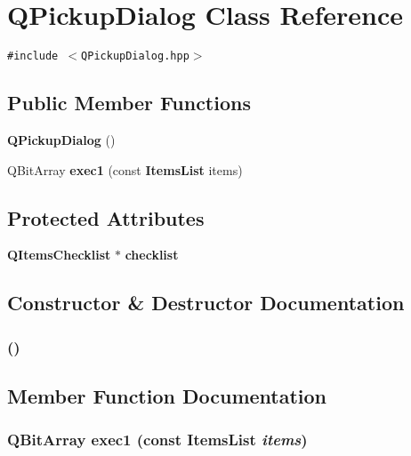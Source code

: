 \section{QPickup\-Dialog Class Reference}
\label{classQPickupDialog}
{\tt \#include $<$QPickup\-Dialog.hpp$>$}

\subsection*{Public Member Functions}
\begin{CompactItemize}
\item 
{\bf QPickup\-Dialog} ()
\item 
QBit\-Array {\bf exec1} (const {\bf Items\-List} items)
\end{CompactItemize}
\subsection*{Protected Attributes}
\begin{CompactItemize}
\item 
{\bf QItems\-Checklist} $\ast$ {\bf checklist}
\end{CompactItemize}


\subsection{Constructor \& Destructor Documentation}
\subsubsection{ ()}\label{classQPickupDialog_a0}




\subsection{Member Function Documentation}
\subsubsection{\setlength{\rightskip}{0pt plus 5cm}QBit\-Array exec1 (const {\bf Items\-List} {\em items})}\label{classQPickupDialog_a1}




